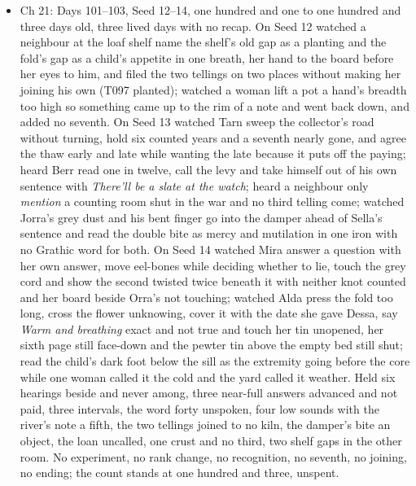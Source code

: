 \documentclass{design/chronicle}
\begin{document}
{\begin{itemize}[leftmargin=1.4em,itemsep=1pt,topsep=3pt,parsep=0pt]
\end{itemize}

\begin{itemize}[leftmargin=1.4em,itemsep=1pt,topsep=3pt,parsep=0pt]

\item Ch 21: Days 101–103, Seed 12–14, one hundred and one to one hundred and three days old, three lived days with no recap. On Seed 12 watched a neighbour at the loaf shelf name the shelf’s old gap as a planting and the fold’s gap as a child’s appetite in one breath, her hand to the board before her eyes to him, and filed the two tellings on two places without making her joining his own (T097 planted); watched a woman lift a pot a hand’s breadth too high so something came up to the rim of a note and went back down, and added no seventh. On Seed 13 watched Tarn sweep the collector’s road without turning, hold six counted years and a seventh nearly gone, and agree the thaw early and late while wanting the late because it puts off the paying; heard Berr read one in twelve, call the levy and take himself out of his own sentence with \emph{There’ll be a slate at the watch}; heard a neighbour only \emph{mention} a counting room shut in the war and no third telling come; watched Jorra’s grey dust and his bent finger go into the damper ahead of Sella’s sentence and read the double bite as mercy and mutilation in one iron with no Grathic word for both. On Seed 14 watched Mira answer a question with her own answer, move eel-bones while deciding whether to lie, touch the grey cord and show the second twisted twice beneath it with neither knot counted and her board beside Orra’s not touching; watched Alda press the fold too long, cross the flower unknowing, cover it with the date she gave Dessa, say \emph{Warm and breathing} exact and not true and touch her tin unopened, her sixth page still face-down and the pewter tin above the empty bed still shut; read the child’s dark foot below the sill as the extremity going before the core while one woman called it the cold and the yard called it weather. Held six hearings beside and never among, three near-full answers advanced and not paid, three intervals, the word forty unspoken, four low sounds with the river’s note a fifth, the two tellings joined to no kiln, the damper’s bite an object, the loan uncalled, one crust and no third, two shelf gaps in the other room. No experiment, no rank change, no recognition, no seventh, no joining, no ending; the count stands at one hundred and three, unspent.

\end{itemize}

}
\end{document}
